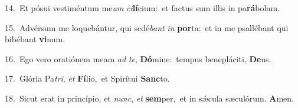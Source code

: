 {\numbfont\textcolor{\numbcolor}{14.}}~Et pósui vestiméntum me\textit{um} \textit{ci}\-\textbf{lí}cium:~\star et factus sum illis in pa\-\textbf{rá}\-bolam.\par
{\numbfont\textcolor{\numbcolor}{15.}}~Advérsum me loquebántur, qui sedé\textit{bant} \textit{in} \textbf{por}\-ta:~\star et in me psallébant qui bibébant \textbf{vi}\-num.\par
{\numbfont\textcolor{\numbcolor}{16.}}~Ego vero oratiónem meam \textit{ad} \textit{te}\-, \textbf{Dó}\-mine:~\star tempus benepláciti, \textbf{De}\-us.\par
{\numbfont\textcolor{\numbcolor}{17.}}~Glória Pa\-\textit{tri}\-, \textit{et} \textbf{Fí}\-lio,~\star et Spirítui \textbf{Sanc}\-to.\par
{\numbfont\textcolor{\numbcolor}{18.}}~Sicut erat in princípio, et \textit{nunc}\-, \textit{et} \textbf{sem}\-per,~\star et in sǽcula sæculórum. \textbf{A}\-men.\par
